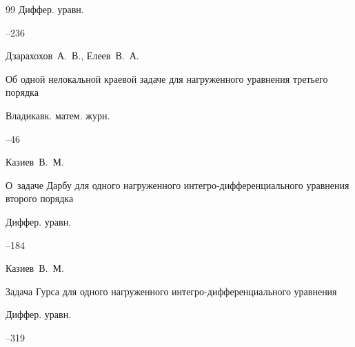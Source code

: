 \begin{thebibliography}{99}
\jour Диффер. уравн.




–236




\by Дзарахохов~А.~В., Елеев~В.~А.

\paper Об одной нелокальной краевой задаче для нагруженного уравнения третьего порядка

\jour Владикавк. матем. журн.




--46












\by Казиев~В.~М.

\paper О~задаче Дарбу для одного нагруженного интегро-дифференциального уравнения второго порядка

\jour Диффер. уравн.




--184





\by Казиев~В.~М.

\paper Задача Гурса для одного нагруженного интегро-дифференциального уравнения

\jour Диффер. уравн.




--319



\end{thebibliography}
